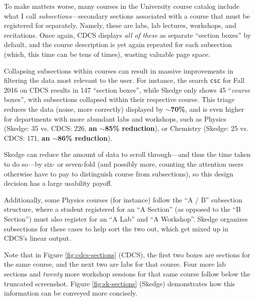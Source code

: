 To make matters worse, many courses in the University course catalog include what I call \emph{subsections}---secondary sections associated with a course that must be registered for separately. Namely, these are labs, lab lectures, workshops, and recitations. Once again, CDCS displays \emph{all of these} as separate ``section boxes'' by default, and the course description is yet again repeated for each subsection (which, this time can be tens of times), wasting valuable page space.

Collapsing subsections within courses can result in massive improvements in filtering the data most relevant to the user. For instance, the search {\tt csc} for Fall 2016 on CDCS results in 147 ``section boxes'', while Skedge only shows 45 ``\emph{course} boxes'', with subsections collapsed within their respective course. This triage reduces the data (noise, more correctly) displayed by \textbf{$\sim$70\%}, and is even higher for departments with more abundant labs and workshops, such as Physics (Skedge: 35 vs. CDCS: 226, \textbf{an $\sim$85\% reduction}), or Chemistry (Skedge: 25 vs. CDCS: 171, \textbf{an $\sim$86\% reduction}).

Skedge can reduce the amount of data to scroll through---and thus the time taken to do so---by six- or seven-fold (and possibly more, counting the attention users otherwise have to pay to distinguish course from subsections), so this design decision has a large usability payoff.

Additionally, some Physics courses (for instance) follow the ``A / B'' subsection structure, where a student registered for an ``A Section'' (as opposed to the ``B Section'') must also register for an ``A Lab'' and ``A Workshop''. Skedge organizes subsections for these cases to help sort the two out, which get mixed up in CDCS's linear output.

Note that in Figure \ref{fig:cdcs-sections} (CDCS), the first two boxes are sections for the same course, and the next two are labs for that course. Four more lab sections and \emph{twenty} more workshop sessions for that same course follow below the truncated screenshot. Figure \ref{fig:sk-sections} (Skedge) demonstrates how this information can be conveyed more concisely.

